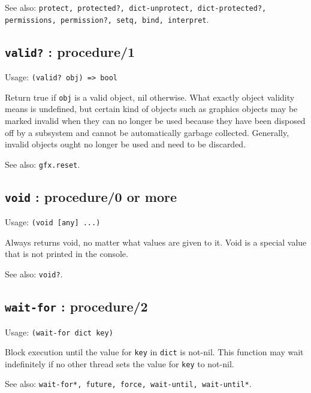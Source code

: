 \documentclass[
]{article}
\newcommand{\passthrough}[1]{#1}
\begin{document}
See also:
\passthrough{\lstinline!protect, protected?, dict-unprotect, dict-protected?, permissions, permission?, setq, bind, interpret!}.

\hypertarget{valid-procedure1-1}{%
\subsection{\texorpdfstring{\texttt{valid?} :
procedure/1}{valid? : procedure/1}}\label{valid-procedure1-1}}

Usage: \passthrough{\lstinline!(valid? obj) => bool!}

Return true if \passthrough{\lstinline!obj!} is a valid object, nil
otherwise. What exactly object validity means is undefined, but certain
kind of objects such as graphics objects may be marked invalid when they
can no longer be used because they have been disposed off by a subsystem
and cannot be automatically garbage collected. Generally, invalid
objects ought no longer be used and need to be discarded.

See also: \passthrough{\lstinline!gfx.reset!}.

\hypertarget{void-procedure0-or-more-1}{%
\subsection{\texorpdfstring{\texttt{void} : procedure/0 or
more}{void : procedure/0 or more}}\label{void-procedure0-or-more-1}}

Usage: \passthrough{\lstinline!(void [any] ...)!}

Always returns void, no matter what values are given to it. Void is a
special value that is not printed in the console.

See also: \passthrough{\lstinline!void?!}.

\hypertarget{wait-for-procedure2-1}{%
\subsection{\texorpdfstring{\texttt{wait-for} :
procedure/2}{wait-for : procedure/2}}\label{wait-for-procedure2-1}}

Usage: \passthrough{\lstinline!(wait-for dict key)!}

Block execution until the value for \passthrough{\lstinline!key!} in
\passthrough{\lstinline!dict!} is not-nil. This function may wait
indefinitely if no other thread sets the value for
\passthrough{\lstinline!key!} to not-nil.

See also:
\passthrough{\lstinline!wait-for*, future, force, wait-until, wait-until*!}.
\end{document}
